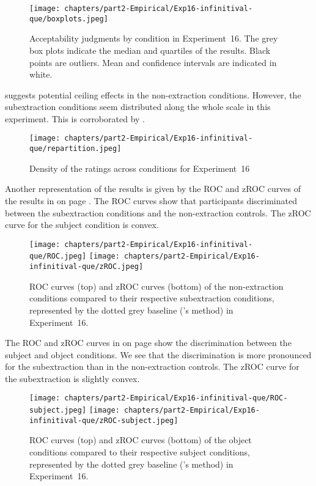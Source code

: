 \begin{figure}
   \centering
    \texttt{[image: chapters/part2-Empirical/Exp16-infinitival-que/boxplots.jpeg]}
    \caption{Acceptability judgments by condition in Experiment~16. The grey box plots indicate the median and quartiles of the results. Black points are outliers. Mean and confidence intervals are indicated in white.}
    \label{fig:exp16-boxplot}
\end{figure}

 suggests potential ceiling effects in the non-extraction conditions. However, the subextraction conditions seem distributed along the whole scale in this experiment. This is corroborated by .

\begin{figure}
    \centering
    \texttt{[image: chapters/part2-Empirical/Exp16-infinitival-que/repartition.jpeg]}
    \caption{Density of the ratings across conditions for Experiment~16}
    \label{fig:exp16-repartition}
\end{figure}

Another representation of the results is given by the ROC and zROC curves of the results in  on page \pageref{fig:exp16-ROC}. The ROC curves show that participants discriminated between the subextraction conditions and the non-extraction controls. The zROC curve for the subject condition is convex.

\begin{figure}
    \centering
    \texttt{[image: chapters/part2-Empirical/Exp16-infinitival-que/ROC.jpeg]}
    \texttt{[image: chapters/part2-Empirical/Exp16-infinitival-que/zROC.jpeg]}
    \caption{ROC curves (top) and zROC curves (bottom) of the non-extraction conditions compared to their respective subextraction conditions, represented by the dotted grey baseline (\citealt{Dillon.2019}'s method) in Experiment~16.}
    \label{fig:exp16-ROC}
\end{figure}

The ROC and zROC curves in  on page \pageref{fig:exp16-ROC-subj} show the discrimination between the subject and object conditions. We see that the discrimination is more pronounced for the subextraction than in the non-extraction controls. The zROC curve for the subextraction is slightly convex.

\begin{figure}
    \centering
    \texttt{[image: chapters/part2-Empirical/Exp16-infinitival-que/ROC-subject.jpeg]}
    \texttt{[image: chapters/part2-Empirical/Exp16-infinitival-que/zROC-subject.jpeg]}
    \caption{ROC curves (top) and zROC curves (bottom) of the object conditions compared to their respective subject conditions, represented by the dotted grey baseline (\citealt{Dillon.2019}'s method) in Experiment~16.}
    \label{fig:exp16-ROC-subj}
\end{figure}

